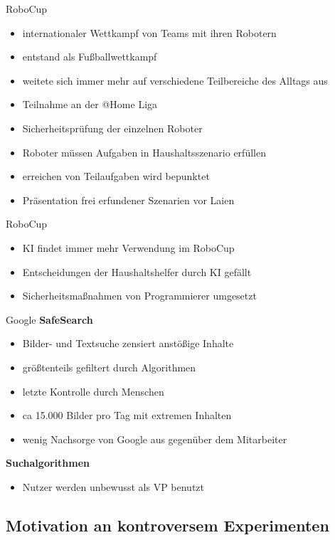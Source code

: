 \documentclass[10pt]{beamer}
\begin{document}
	\begin{frame}{RoboCup}
		\begin{itemize}
			\item internationaler Wettkampf von Teams mit ihren Robotern
			\item entstand als Fußballwettkampf
			\item weitete sich immer mehr auf verschiedene Teilbereiche des Alltags aus
			\item Teilnahme an der @Home Liga
			\item Sicherheitsprüfung der einzelnen Roboter
			\item Roboter müssen Aufgaben in Haushaltsszenario erfüllen
			\item erreichen von Teilaufgaben wird bepunktet
			\item Präsentation frei erfundener Szenarien vor Laien 
		\end{itemize}
	\end{frame}
		\begin{frame}{RoboCup}
			\begin{itemize}
				\item KI findet immer mehr Verwendung im RoboCup
				\item Entscheidungen der Haushaltshelfer durch KI gefällt
				\item Sicherheitsmaßnahmen von Programmierer umgesetzt
			\end{itemize}
		\end{frame}
		\begin{frame}{Google}
			\textbf{SafeSearch}
			\begin{itemize}
				\item Bilder- und Textsuche zensiert anstößige Inhalte
				\item größtenteils gefiltert durch Algorithmen
				\item letzte Kontrolle durch Menschen
				\item ca 15.000 Bilder pro Tag mit extremen Inhalten
				\item wenig Nachsorge von Google aus gegenüber dem Mitarbeiter
			\end{itemize}
			\textbf{Suchalgorithmen}
			\begin{itemize}
				\item Nutzer werden unbewusst als VP benutzt
			\end{itemize}
		\end{frame}
	

	
\subsection{Motivation an kontroversem Experimenten}
\end{document}
